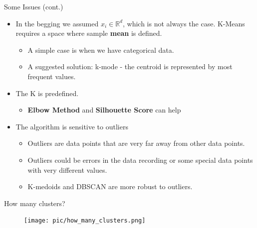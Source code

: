 \documentclass[serif, aspectratio=169]{beamer}
\begin{document}
\begin{frame}{Some Issues (cont.)}
    \begin{itemize}
        \item In the begging we assumed $x_i \in \mathbb{R}^d$, which is not always the case. K-Means requires a space where sample \textbf{mean} is defined.
        \begin{itemize}
            \item A simple case is when we have categorical data. 
            \item  A suggested solution: k-mode - the centroid is represented by most frequent values.
        \end{itemize}
        \item The K is predefined.  
   \begin{itemize}
       \item  \textbf{Elbow Method} and \textbf{Silhouette Score} can help
   \end{itemize}
        \item The algorithm is sensitive to outliers
        \begin{itemize}
            \item Outliers are data points that are very far away from other data points. 
\item Outliers could be errors in the data recording or some special data points with very different values.
\item K-medoids  and DBSCAN are more robust to outliers.
        \end{itemize}

    \end{itemize}
\end{frame}

\begin{frame}{How many clusters?}
    \begin{figure}
        \centering
        \texttt{[image: pic/how\_many\_clusters.png]}
    \end{figure}
\end{frame}
\end{document}
